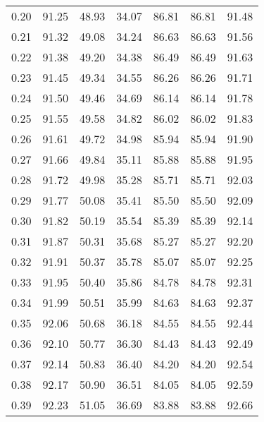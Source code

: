 \begin{tabular}{|c|c|c|c|c|c|c|}
      0.20 &     91.25 &     48.93 &      34.07 &   86.81 &      86.81 &         91.48 \\
      0.21 &     91.32 &     49.08 &      34.24 &   86.63 &      86.63 &         91.56 \\
      0.22 &     91.38 &     49.20 &      34.38 &   86.49 &      86.49 &         91.63 \\
      0.23 &     91.45 &     49.34 &      34.55 &   86.26 &      86.26 &         91.71 \\
      0.24 &     91.50 &     49.46 &      34.69 &   86.14 &      86.14 &         91.78 \\
      0.25 &     91.55 &     49.58 &      34.82 &   86.02 &      86.02 &         91.83 \\
      0.26 &     91.61 &     49.72 &      34.98 &   85.94 &      85.94 &         91.90 \\
      0.27 &     91.66 &     49.84 &      35.11 &   85.88 &      85.88 &         91.95 \\
      0.28 &     91.72 &     49.98 &      35.28 &   85.71 &      85.71 &         92.03 \\
      0.29 &     91.77 &     50.08 &      35.41 &   85.50 &      85.50 &         92.09 \\
      0.30 &     91.82 &     50.19 &      35.54 &   85.39 &      85.39 &         92.14 \\
      0.31 &     91.87 &     50.31 &      35.68 &   85.27 &      85.27 &         92.20 \\
      0.32 &     91.91 &     50.37 &      35.78 &   85.07 &      85.07 &         92.25 \\
      0.33 &     91.95 &     50.40 &      35.86 &   84.78 &      84.78 &         92.31 \\
      0.34 &     91.99 &     50.51 &      35.99 &   84.63 &      84.63 &         92.37 \\
      0.35 &     92.06 &     50.68 &      36.18 &   84.55 &      84.55 &         92.44 \\
      0.36 &     92.10 &     50.77 &      36.30 &   84.43 &      84.43 &         92.49 \\
      0.37 &     92.14 &     50.83 &      36.40 &   84.20 &      84.20 &         92.54 \\
      0.38 &     92.17 &     50.90 &      36.51 &   84.05 &      84.05 &         92.59 \\
      0.39 &     92.23 &     51.05 &      36.69 &   83.88 &      83.88 &         92.66 \\

\end{tabular}
